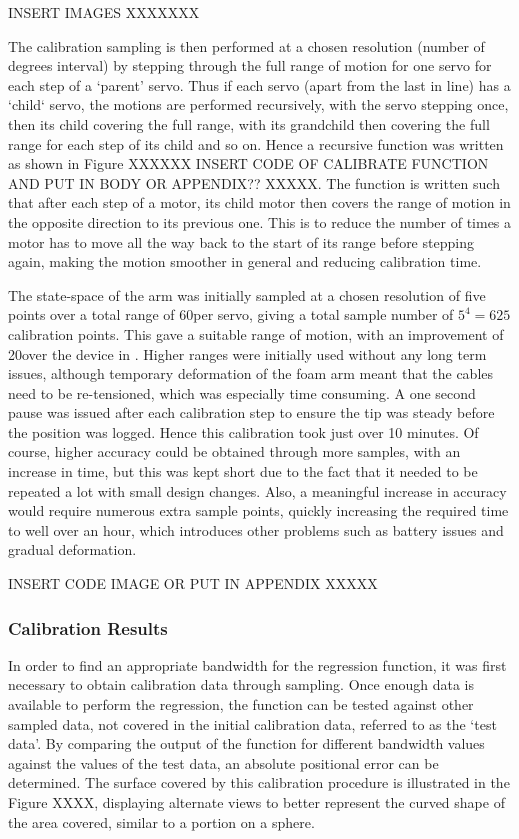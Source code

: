 \documentclass[11pt]{article}
\begin{document}
INSERT IMAGES XXXXXXX


The calibration sampling is then performed at a chosen resolution (number of degrees interval) by stepping through the full range of motion for one servo for each step of a `parent' servo. Thus if each servo (apart from the last in line) has a `child` servo, the motions are performed recursively, with the servo stepping once, then its child covering the full range, with its grandchild then covering the full range for each step of its child and so on. Hence a recursive function was written as shown in Figure XXXXXX INSERT CODE OF CALIBRATE FUNCTION AND PUT IN BODY OR APPENDIX?? XXXXX. The function is written such that after each step of a motor, its child motor then covers the range of motion in the opposite direction to its previous one. This is to reduce the number of times a motor has to move all the way back to the start of its range before stepping again, making the motion smoother in general and reducing calibration time. 

The state-space of the arm was initially sampled at a chosen resolution of five points over a total range of 60\degree per servo, giving a total sample number of $5^4 = 625$ calibration points. This gave a suitable range of motion, with an improvement of 20\degree over the device in \cite{GreggSmithDesign}. Higher ranges were initially used without any long term issues, although temporary deformation of the foam arm meant that the cables need to be re-tensioned, which was especially time consuming. A one second pause was issued after each calibration step to ensure the tip was steady before the position was logged. Hence this calibration took just over 10 minutes. Of course, higher accuracy could be obtained through more samples, with an increase in time, but this was kept short due to the fact that it needed to be repeated a lot with small design changes. Also, a meaningful increase in accuracy would require numerous extra sample points, quickly increasing the required time to well over an hour, which introduces other problems such as battery issues and gradual deformation.

INSERT CODE IMAGE OR PUT IN APPENDIX XXXXX	





\subsubsection{Calibration Results}
In order to find an appropriate bandwidth for the regression function, it was first necessary to obtain calibration data through sampling. Once enough data is available to perform the regression, the function can be tested against other sampled data, not covered in the initial calibration data, referred to as the `test data'. By comparing the output of the function for different bandwidth values against the values of the test data, an absolute positional error can be determined. The surface covered by this calibration procedure is illustrated in the Figure XXXX, displaying alternate views to better represent the curved shape of the area covered, similar to a portion on a sphere.
\end{document}
